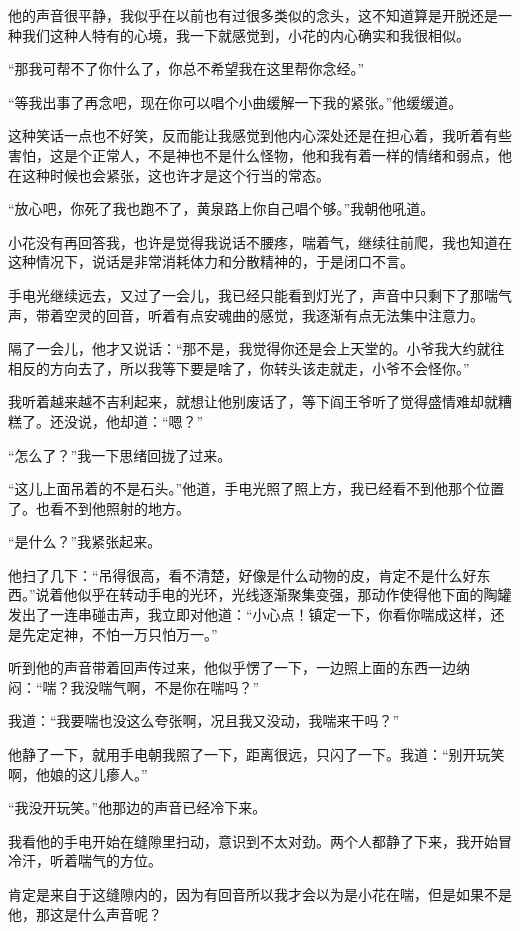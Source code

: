 他的声音很平静，我似乎在以前也有过很多类似的念头，这不知道算是开脱还是一种我们这种人特有的心境，我一下就感觉到，小花的内心确实和我很相似。

“那我可帮不了你什么了，你总不希望我在这里帮你念经。”

“等我出事了再念吧，现在你可以唱个小曲缓解一下我的紧张。”他缓缓道。

这种笑话一点也不好笑，反而能让我感觉到他内心深处还是在担心着，我听着有些害怕，这是个正常人，不是神也不是什么怪物，他和我有着一样的情绪和弱点，他在这种时候也会紧张，这也许才是这个行当的常态。

“放心吧，你死了我也跑不了，黄泉路上你自己唱个够。”我朝他吼道。

小花没有再回答我，也许是觉得我说话不腰疼，喘着气，继续往前爬，我也知道在这种情况下，说话是非常消耗体力和分散精神的，于是闭口不言。

手电光继续远去，又过了一会儿，我已经只能看到灯光了，声音中只剩下了那喘气声，带着空灵的回音，听着有点安魂曲的感觉，我逐渐有点无法集中注意力。

隔了一会儿，他才又说话：“那不是，我觉得你还是会上天堂的。小爷我大约就往相反的方向去了，所以我等下要是啥了，你转头该走就走，小爷不会怪你。”

我听着越来越不吉利起来，就想让他别废话了，等下阎王爷听了觉得盛情难却就糟糕了。还没说，他却道：“嗯？”

“怎么了？”我一下思绪回拢了过来。

“这儿上面吊着的不是石头。”他道，手电光照了照上方，我已经看不到他那个位置了。也看不到他照射的地方。

“是什么？”我紧张起来。

他扫了几下：“吊得很高，看不清楚，好像是什么动物的皮，肯定不是什么好东西。”说着他似乎在转动手电的光环，光线逐渐聚集变强，那动作使得他下面的陶罐发出了一连串碰击声，我立即对他道：“小心点！镇定一下，你看你喘成这样，还是先定定神，不怕一万只怕万一。”

听到他的声音带着回声传过来，他似乎愣了一下，一边照上面的东西一边纳闷：“喘？我没喘气啊，不是你在喘吗？”

我道：“我要喘也没这么夸张啊，况且我又没动，我喘来干吗？”

他静了一下，就用手电朝我照了一下，距离很远，只闪了一下。我道：“别开玩笑啊，他娘的这儿瘆人。”

“我没开玩笑。”他那边的声音已经冷下来。

我看他的手电开始在缝隙里扫动，意识到不太对劲。两个人都静了下来，我开始冒冷汗，听着喘气的方位。

肯定是来自于这缝隙内的，因为有回音所以我才会以为是小花在喘，但是如果不是他，那这是什么声音呢？


